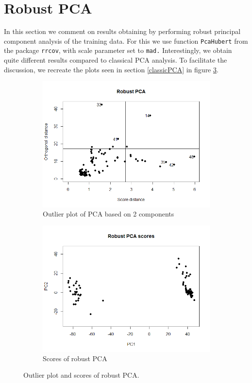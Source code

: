 \documentclass[12pt]{article}
\begin{document}
\section{Robust PCA}
In this section we comment on results obtaining by performing robust principal component analysis of the training data. For this we use function \texttt{PcaHubert} from the
package \texttt{rrcov}, with scale parameter set to \texttt{mad.} Interestingly, we obtain quite different results compared to classical PCA analysis. To facilitate
the discussion, we recreate the plots seen in section \ref{classicPCA} in figure \ref{robust}.

\begin{figure}[h!]
  \begin{subfigure}[b]{0.5\linewidth}
      \centering
      \includegraphics[width=\textwidth]{../images/robustPCAoutliers.png}
   \caption{Outlier plot of PCA based on 2 components}\label{fig:robustOutliers}
  \end{subfigure}%
  \begin{subfigure}[b]{0.5\linewidth}
      \centering
   \includegraphics[width=\textwidth]{../images/robustPCAscores.png}
   \caption{Scores of robust PCA}\label{fig:scoresRobust}
  \end{subfigure}%
 \caption{Outlier plot and scores of robust PCA.}
 \label{robust}
\end{figure} 
\end{document}

